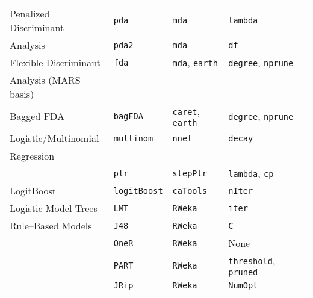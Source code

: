 \documentclass[12pt]{article}
\begin{document}
\begin{longtable}{lllll}
      Penalized Discriminant  &
         \texttt{pda} & 
            \texttt{mda}       & 
            \texttt{lambda} & \\
      
     \: \: Analysis &
         \texttt{pda2} & 
            \texttt{mda}       & 
            \texttt{df} & \\     
      
      Flexible Discriminant  &
         \texttt{fda} & 
            \texttt{mda}, \texttt{earth}       & 
            \texttt{degree}, \texttt{nprune} & \\
      \: \: Analysis (MARS basis)\\      
      
      Bagged FDA &
         \texttt{bagFDA} & 
            \texttt{caret},  \texttt{earth}       & 
            \texttt{degree}, \texttt{nprune} \\   
            
      Logistic/Multinomial  &
         \texttt{multinom} & 
            \texttt{nnet}       & 
            \texttt{decay}& \\   
      \: \: Regression \\ 
      
   &
         \texttt{plr} & 
            \texttt{stepPlr}       & 
            \texttt{lambda}, \texttt{cp} & \\     
            
      
      LogitBoost &      
         \texttt{logitBoost} & 
            \texttt{caTools}       &          
            \texttt{nIter}\\              
            
      Logistic Model Trees &
         \texttt{LMT} & 
            \texttt{RWeka}    & 
            \texttt{iter}  \\  
            
      Rule--Based Models &
         \texttt{J48} & 
            \texttt{RWeka}    & 
            \texttt{C}  \\  
            
       &
         \texttt{OneR} & 
            \texttt{RWeka}    & 
            None  \\  
            
       &
         \texttt{PART} & 
            \texttt{RWeka}    & 
            \texttt{threshold}, \texttt{pruned}   \\  
            
        &
         \texttt{JRip} & 
            \texttt{RWeka}    & 
            \texttt{NumOpt}   \\
            

\end{longtable}
\end{document}
